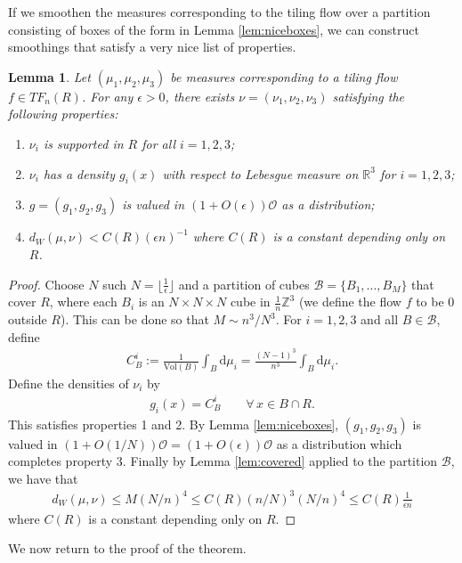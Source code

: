 \documentclass[11pt]{article}
\newtheorem{lemma}[thm]{Lemma}
\theoremstyle{remark}
\theoremstyle{definition}
\newcommand{\mc}[1]{\mathcal{#1}}
\newcommand{\m}[1]{\mathbb{#1}}
\newcommand{\dd}{\mathrm{d}}
\begin{document}
If we smoothen the measures corresponding to the tiling flow over a partition consisting of boxes of the form in Lemma \ref{lem:niceboxes}, we can construct smoothings that satisfy a very nice list of properties. 
\begin{lemma}\label{lem:spreadflows}
	Let $(\mu_1,\mu_2,\mu_3)$ be measures corresponding to a tiling flow $f\in TF_n(R)$. For any $\epsilon>0$, there exists $\nu= (\nu_1,\nu_2,\nu_3)$ satisfying the following properties: 
	\begin{enumerate}
	    \item $\nu_i$ is supported in $R$ for all $i=1,2,3$;
	    \item $\nu_i$ has a density $g_i(x)$ with respect to Lebesgue measure on $\mathbb{R}^3$ for $i=1,2,3$;
	    \item $g = (g_1,g_2,g_3)$ is valued in $(1+O(\epsilon)) \mathcal{O}$ as a distribution;
	    \item $d_W(\mu,\nu) < C(R) (\epsilon n)^{-1}$ where $C(R)$ is a constant depending only on $R$. 
	\end{enumerate}
\end{lemma}
\begin{proof}
Choose $N$ such $N=\lfloor\frac1\epsilon\rfloor$ and a partition of cubes $\mc B = \{B_1,...,B_M\}$ that cover $R$, where each $B_i$ is an $N\times N\times N$ cube in $\frac{1}{n} \m Z^3$ (we define the flow $f$ to be $0$ outside $R$). This can be done so that $M\sim n^3/N^3$. For $i=1,2,3$ and all $B\in \mathcal{B}$, define 
\begin{align*}
    C_B^i := \frac{1}{\text{Vol}(B)} \int_{B} \dd \mu_i = \frac{(N-1)^3}{n^3}\int_{B} \dd \mu_i.
\end{align*}
Define the densities of $\nu_i$ by
\begin{align*}
    g_i(x) =  C_B^{i} \qquad \forall \, x\in B\cap R.
\end{align*}
This satisfies properties 1 and 2. By Lemma \ref{lem:niceboxes}, $(g_1,g_2,g_3)$ is valued in $(1+O(1/N)) \mc O= (1+O(\epsilon))\mc O$ as a distribution which completes property 3. Finally by Lemma \ref{lem:covered} applied to the partition $\mc B$, we have that 
\begin{align*}
    d_W(\mu,\nu) \leq M (N/n)^4\leq C(R)(n/N)^3 (N/n)^4\leq C(R)\frac{1}{\epsilon n}
\end{align*}
where $C(R)$ is a constant depending only on $R$.
\end{proof}

We now return to the proof of the theorem.
\end{document}
